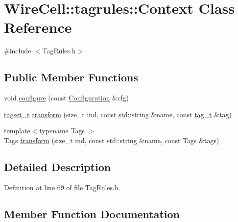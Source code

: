 \hypertarget{class_wire_cell_1_1tagrules_1_1_context}{}\section{Wire\+Cell\+:\+:tagrules\+:\+:Context Class Reference}
\label{class_wire_cell_1_1tagrules_1_1_context}


{\ttfamily \#include $<$Tag\+Rules.\+h$>$}

\subsection*{Public Member Functions}
\begin{DoxyCompactItemize}
\item 
void \hyperlink{class_wire_cell_1_1tagrules_1_1_context_a3c7d49c79f0e8f1fb0e583fdfc481b59}{configure} (const \hyperlink{namespace_wire_cell_a9f705541fc1d46c608b3d32c182333ee}{Configuration} \&cfg)
\item 
\hyperlink{namespace_wire_cell_1_1tagrules_a80263165e3d13e49e317c045829f76cb}{tagset\+\_\+t} \hyperlink{class_wire_cell_1_1tagrules_1_1_context_aad708e6ea6a1bf0b9e050559fea62ae1}{transform} (size\+\_\+t ind, const std\+::string \&name, const \hyperlink{namespace_wire_cell_1_1tagrules_ae74af6e8edaf0f64b70f6df4e0b66cdc}{tag\+\_\+t} \&tag)
\item 
{\footnotesize template$<$typename Tags $>$ }\\Tags \hyperlink{class_wire_cell_1_1tagrules_1_1_context_aeade5e7b1f30a07bb1194320575e0ec0}{transform} (size\+\_\+t ind, const std\+::string \&name, const Tags \&tags)
\end{DoxyCompactItemize}


\subsection{Detailed Description}


Definition at line 69 of file Tag\+Rules.\+h.



\subsection{Member Function Documentation}
\mbox{\label{class_wire_cell_1_1tagrules_1_1_context_a3c7d49c79f0e8f1fb0e583fdfc481b59}} 
